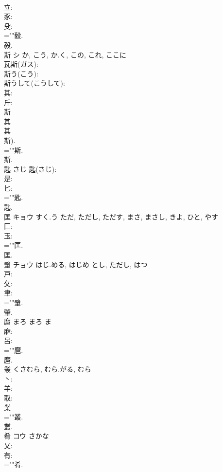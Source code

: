 \documentclass[8pt]{extreport}
\begin{document}
\begin{CJK}{UTF8}{min}
\\	立: 
\\	豕: 
\\	殳: 
\\	=""毅.
\\	毅.
\\	斯	シ	か, こう, か.く, この, これ, ここに		
\\	瓦斯(ガス): 
\\	斯う(こう): 
\\	斯うして(こうして): 
\\	其: 
\\	斤: 
\\	斯 
\\	其 
\\	其 
\\	斯). 
\\	=""斯.
\\	斯.
\\	匙		さじ			匙(さじ): 
\\	是: 
\\	匕: 
\\	=""匙.
\\	匙.
\\	匡	キョウ	すく.う	ただ, ただし, ただす, まさ, まさし, きよ, ひと, やす	
\\	匚: 
\\	玉: 
\\	=""匡.
\\	匡.
\\	肇	チョウ	はじ.める, はじめ	とし, ただし, はつ	
\\	戸: 
\\	攵: 
\\	聿: 
\\	=""肇.
\\	肇.
\\	麿	まろ	まろ	ま	
\\	麻: 
\\	呂: 
\\	=""麿.
\\	麿.
\\	叢		くさむら, むら.がる, むら				
\\	丶: 
\\	羊: 
\\	取: 
\\	業 
\\	=""叢.
\\	叢.
\\	肴	コウ	さかな		
\\	乂: 
\\	有: 
\\	=""肴.

\end{CJK}
\end{document}

